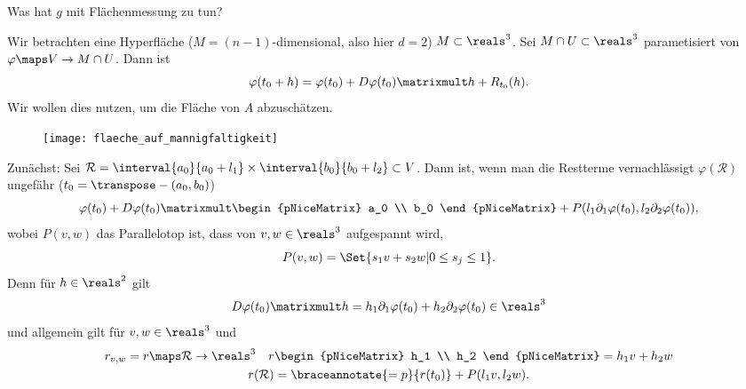 \begin{frage}
  Was hat \( g \) mit Flächenmessung zu tun?
  \begin{eigenschaftenenumerate}
    \item Wir betrachten eine Hyperfläche
     (\( M=(n-1) \)-dimensional,
      also hier \( d=2 \)) 
      \( M\subset \reals^3\).
       Sei \( M\cap U\subset \reals^3 \) parametisiert von 
       \( \varphi\maps V\to M\cap U \). Dann ist
    \begin{equation*}
      \varphi(t_0+h)=\varphi(t_0)+D\varphi(t_0)\matrixmult h+R_{t_0}(h).
    \end{equation*}
    Wir wollen dies nutzen, um die Fläche von \( A \) abzuschätzen.
    \begin{figure}[H]
      \centering
      \texttt{[image: flaeche\_auf\_mannigfaltigkeit]}
      \label{fig:flaeche_auf_mannigfaltigkeit}
    \end{figure}
    \item Zunächst: Sei \( \mathcal{R}=\interval{a_0}{a_0+l_1}\times \interval{b_0}{b_0+l_2}\subset V \). Dann ist, wenn man die Restterme vernachlässigt \( \varphi(\mathcal{R}) \) ungefähr (\( t_0=\transpose-{(a_0,b_0)} \))
    \begin{equation*}
      \varphi(t_0)+D\varphi(t_0)\matrixmult \begin{pNiceMatrix} a_0 \\ b_0 \end{pNiceMatrix}+P(l_1 \partial_1 \varphi(t_0),l_2 \partial_2 \varphi(t_0)),
    \end{equation*}
    wobei \( P(v,w) \) das Parallelotop ist, dass von \( v,w\in \reals^3 \) aufgespannt wird,
    \begin{equation*}
      P(v,w)=\Set{s_1 v+s_2 w|0\leq s_j\leq 1}.
    \end{equation*}
    Denn für \( h\in \reals^2 \) gilt
    \begin{equation*}
      D\varphi(t_0)\matrixmult h=h_1 \partial_1 \varphi(t_0)+h_2 \partial_2 \varphi(t_0)\in \reals^3
    \end{equation*}
    und allgemein gilt für \( v ,w \in \reals^3\) und
    \begin{gather*}
      r_{v,w}=r\maps \mathcal{R}\to \reals^3\quad r\begin{pNiceMatrix} h_1 \\ h_2 \end{pNiceMatrix}=h_1 v+ h_2 w\\
      r(\mathcal{R})=\braceannotate{=p}{r(t_0)}+P(l_1 v, l_2 w).

\end{gather*}
\end{eigenschaftenenumerate}
\end{frage}
